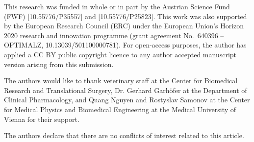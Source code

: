 \documentclass{optica-article}
\begin{document}
\begin{backmatter}
\noindent This research was funded in whole or in part by the Austrian Science Fund (FWF) [10.55776/P35557] and [10.55776/P25823]. %
This work was also supported by the European Research Council (ERC) under the European Union's Horizon 2020 research and innovation programme (grant agreement No.\ 640396 -- OPTIMALZ, 10.13039/501100000781). For open-access purposes, the author has applied a CC BY public copyright licence to any author accepted manuscript version arising from this submission.

\noindent The authors would like to thank veterinary staff at the Center for Biomedical Research and Translational Surgery, Dr. Gerhard Garh\"ofer at the Department of Clinical Pharmacology, and Quang Nguyen and Rostyslav Samonov at the Center for Medical Physics and Biomedical Engineering at the Medical University of Vienna for their support.

\noindent The authors declare that there are no conflicts of interest related to this article.




\end{backmatter}
\end{document}
